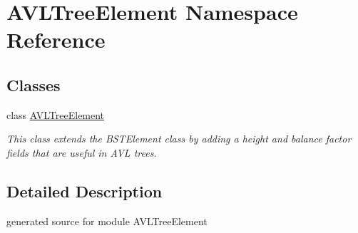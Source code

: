 \hypertarget{namespace_a_v_l_tree_element}{}\section{A\+V\+L\+Tree\+Element Namespace Reference}
\label{namespace_a_v_l_tree_element}
\subsection*{Classes}
\begin{DoxyCompactItemize}
\item 
class \hyperlink{class_a_v_l_tree_element_1_1_a_v_l_tree_element}{A\+V\+L\+Tree\+Element}
\begin{DoxyCompactList}\small\item\em This class extends the B\+S\+T\+Element class by adding a height and balance factor fields that are useful in A\+VL trees. \end{DoxyCompactList}\end{DoxyCompactItemize}


\subsection{Detailed Description}
\begin{DoxyVerb}generated source for module AVLTreeElement \end{DoxyVerb}
 